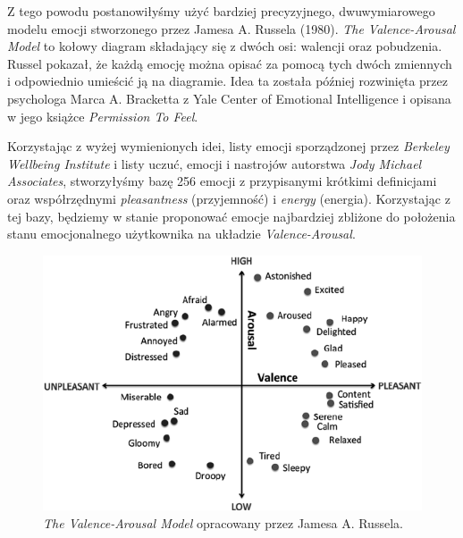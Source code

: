 \documentclass[inz, shortabstract]{iithesis}
\begin{document}
Z tego powodu postanowiłyśmy użyć bardziej precyzyjnego, dwuwymiarowego modelu emocji stworzonego przez Jamesa A. Russela (1980). \textit{The Valence-Arousal Model} to kołowy diagram składający się z dwóch osi: walencji oraz pobudzenia. Russel pokazał, że każdą emocję można opisać za pomocą tych dwóch zmiennych i odpowiednio umieścić ją na diagramie. Idea ta została później rozwinięta przez psychologa Marca A. Bracketta z Yale Center of Emotional Intelligence i opisana w jego książce \textit{Permission To Feel}.


Korzystając z wyżej wymienionych idei, listy emocji sporządzonej przez \textit{Berkeley Wellbeing Institute}\protect\footnotemark{} i listy uczuć, emocji i nastrojów autorstwa \textit{Jody Michael Associates}\protect\footnotemark, stworzyłyśmy bazę 256 emocji z przypisanymi krótkimi definicjami oraz współrzędnymi \textit{pleasantness} (przyjemność) i \textit{energy} (energia). Korzystając z tej bazy, będziemy w stanie proponować emocje najbardziej zbliżone do położenia stanu emocjonalnego użytkownika na układzie \textit{Valence-Arousal}.



\begin{figure}[!ht]
\includegraphics[width=1\textwidth]{Russells-Valence-Arousal-Model.png} 
\caption{\textit{The Valence-Arousal Model} opracowany przez Jamesa A. Russela.\protect\footnotemark}
\end{figure}
\end{document}
